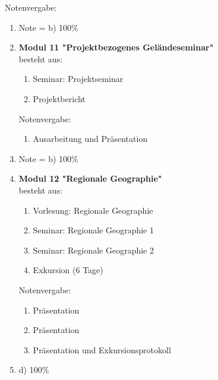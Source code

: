   Notenvergabe:
  \begin{enumerate}
   \item[b) Poster-Präsentation oder Praktikumsbericht
  \end{enumerate}
   \item[] Note = b) 100\%

 \item \textbf{Modul 11 "Projektbezogenes Geländeseminar"}  \\ besteht aus:
  \begin{enumerate}
   \item Seminar: Projektseminar
   \item Projektbericht
  \end{enumerate}
  Notenvergabe:
  \begin{enumerate}
    \item Ausarbeitung und Präsentation
   \end{enumerate}
   \item[] Note = b) 100\%

 \item \textbf{Modul 12 "Regionale Geographie"}  \\ besteht aus:
  \begin{enumerate}
   \item Vorlesung: Regionale Geographie
   \item Seminar: Regionale Geographie 1
   \item Seminar: Regionale Geographie 2
   \item Exkursion (6 Tage)
  \end{enumerate}
  Notenvergabe:
  \begin{enumerate}
   \item Präsentation
   \item Präsentation
   \item Präsentation und Exkursionsprotokoll
  \end{enumerate}
  \item[]  d) 100\% 


\end{enumerate}
